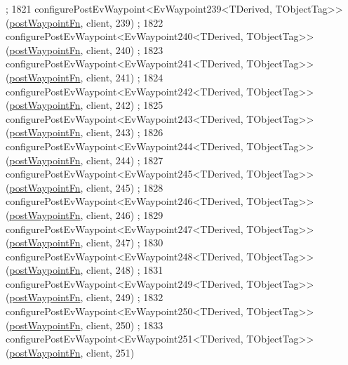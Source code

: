 \begin{DoxyCode}
      ;
1821     configurePostEvWaypoint<EvWaypoint239<TDerived, TObjectTag>>(\hyperlink{classcl__move__base__z_1_1WaypointEventDispatcher_a964a57fcce5d48ec60243230722d8dd7}{postWaypointFn}, client, 239)
      ;
1822     configurePostEvWaypoint<EvWaypoint240<TDerived, TObjectTag>>(\hyperlink{classcl__move__base__z_1_1WaypointEventDispatcher_a964a57fcce5d48ec60243230722d8dd7}{postWaypointFn}, client, 240)
      ;
1823     configurePostEvWaypoint<EvWaypoint241<TDerived, TObjectTag>>(\hyperlink{classcl__move__base__z_1_1WaypointEventDispatcher_a964a57fcce5d48ec60243230722d8dd7}{postWaypointFn}, client, 241)
      ;
1824     configurePostEvWaypoint<EvWaypoint242<TDerived, TObjectTag>>(\hyperlink{classcl__move__base__z_1_1WaypointEventDispatcher_a964a57fcce5d48ec60243230722d8dd7}{postWaypointFn}, client, 242)
      ;
1825     configurePostEvWaypoint<EvWaypoint243<TDerived, TObjectTag>>(\hyperlink{classcl__move__base__z_1_1WaypointEventDispatcher_a964a57fcce5d48ec60243230722d8dd7}{postWaypointFn}, client, 243)
      ;
1826     configurePostEvWaypoint<EvWaypoint244<TDerived, TObjectTag>>(\hyperlink{classcl__move__base__z_1_1WaypointEventDispatcher_a964a57fcce5d48ec60243230722d8dd7}{postWaypointFn}, client, 244)
      ;
1827     configurePostEvWaypoint<EvWaypoint245<TDerived, TObjectTag>>(\hyperlink{classcl__move__base__z_1_1WaypointEventDispatcher_a964a57fcce5d48ec60243230722d8dd7}{postWaypointFn}, client, 245)
      ;
1828     configurePostEvWaypoint<EvWaypoint246<TDerived, TObjectTag>>(\hyperlink{classcl__move__base__z_1_1WaypointEventDispatcher_a964a57fcce5d48ec60243230722d8dd7}{postWaypointFn}, client, 246)
      ;
1829     configurePostEvWaypoint<EvWaypoint247<TDerived, TObjectTag>>(\hyperlink{classcl__move__base__z_1_1WaypointEventDispatcher_a964a57fcce5d48ec60243230722d8dd7}{postWaypointFn}, client, 247)
      ;
1830     configurePostEvWaypoint<EvWaypoint248<TDerived, TObjectTag>>(\hyperlink{classcl__move__base__z_1_1WaypointEventDispatcher_a964a57fcce5d48ec60243230722d8dd7}{postWaypointFn}, client, 248)
      ;
1831     configurePostEvWaypoint<EvWaypoint249<TDerived, TObjectTag>>(\hyperlink{classcl__move__base__z_1_1WaypointEventDispatcher_a964a57fcce5d48ec60243230722d8dd7}{postWaypointFn}, client, 249)
      ;
1832     configurePostEvWaypoint<EvWaypoint250<TDerived, TObjectTag>>(\hyperlink{classcl__move__base__z_1_1WaypointEventDispatcher_a964a57fcce5d48ec60243230722d8dd7}{postWaypointFn}, client, 250)
      ;
1833     configurePostEvWaypoint<EvWaypoint251<TDerived, TObjectTag>>(\hyperlink{classcl__move__base__z_1_1WaypointEventDispatcher_a964a57fcce5d48ec60243230722d8dd7}{postWaypointFn}, client, 251)

\end{DoxyCode}
